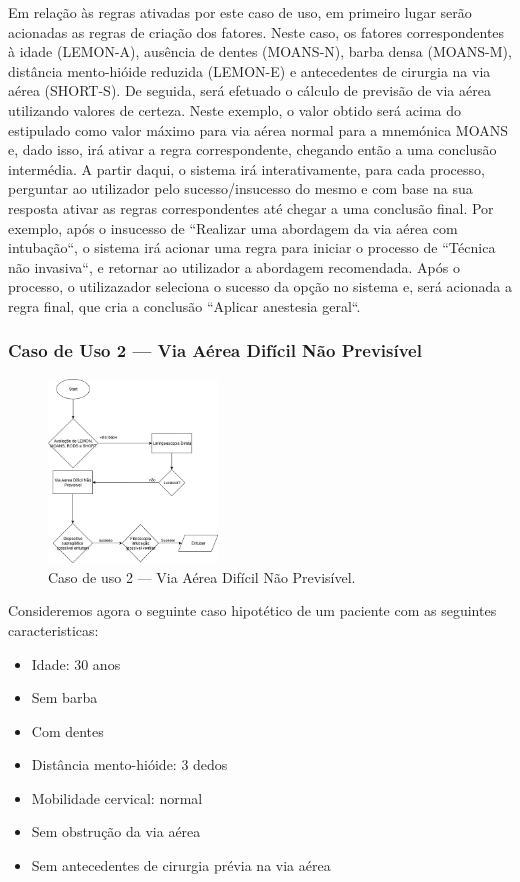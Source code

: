 \documentclass[a4paper,12pt,twoside]{article}
\begin{document}
    Em relação às regras ativadas por este caso de uso, em primeiro lugar serão acionadas as regras de criação dos fatores. Neste caso, os fatores correspondentes à idade (LEMON-A), ausência de dentes (MOANS-N), barba densa (MOANS-M), distância mento-hióide reduzida (LEMON-E) e antecedentes de cirurgia na via aérea (SHORT-S). De seguida, será efetuado o cálculo de previsão de via aérea utilizando valores de certeza. Neste exemplo, o valor obtido será acima do estipulado como valor máximo para via aérea normal para a mnemónica MOANS e, dado isso, irá ativar a regra correspondente, chegando então a uma conclusão intermédia. A partir daqui, o sistema irá interativamente, para cada processo, perguntar ao utilizador pelo sucesso/insucesso do mesmo e com base na sua resposta ativar as regras correspondentes até chegar a uma conclusão final. Por exemplo, após o insucesso de ``Realizar uma abordagem da via aérea com intubação``, o sistema irá acionar uma regra para iniciar o processo de ``Técnica não invasiva``, e retornar ao utilizador a abordagem recomendada. Após o processo, o utilizazador seleciona o sucesso da opção no sistema e, será acionada a regra final, que cria a conclusão ``Aplicar anestesia geral``.

    \subsubsection{Caso de Uso 2 --- Via Aérea Difícil Não Previsível}

    \begin{figure}[H]
        \centering
        \includegraphics[width=0.4\textwidth]{./resources/pdf/casoDeUso2.jpg}
        \caption{Caso de uso 2 --- Via Aérea Difícil Não Previsível.}
        \label{fig:caso2}
    \end{figure}

    Consideremos agora o seguinte caso hipotético de um paciente com as seguintes caracteristicas:
    \begin{itemize}
        \setlength{\itemsep}{2pt} 
        \setlength{\parskip}{0pt} 
        \setlength{\parsep}{0pt} 
        \item Idade: 30 anos
        \item Sem barba
        \item Com dentes
        \item Distância mento-hióide: 3 dedos
        \item Mobilidade cervical: normal
        \item Sem obstrução da via aérea
        \item Sem antecedentes de cirurgia prévia na via aérea
    \end{itemize}
\end{document}
